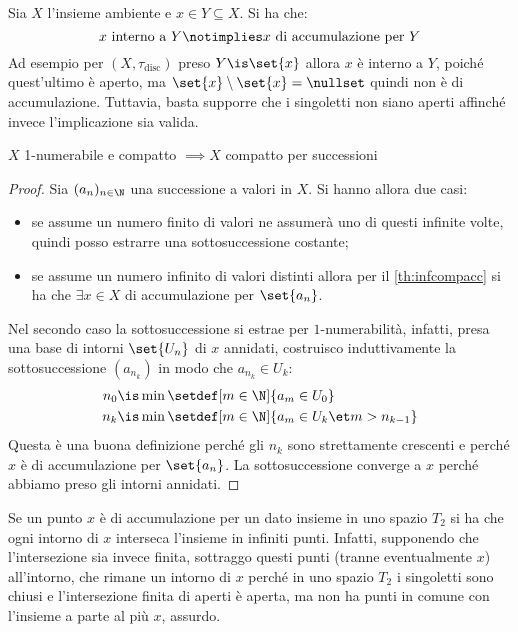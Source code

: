 

\begin{oss}
	Sia $X$ l'insieme ambiente e $x\in Y\subseteq X$.
	Si ha che:
	\[\text{$x$ interno a $Y$} \notimplies \text{$x$ di accumulazione per $Y$}\]
	Ad esempio per $(X, \tau_\text{disc})$ preso $Y\is\set{x}$ allora $x$ è interno a $Y$, poiché quest'ultimo è aperto, ma $\set{x}\setminus\set{x} = \nullset$ quindi non è di accumulazione.
	Tuttavia, basta supporre che i singoletti non siano aperti affinché invece l'implicazione sia valida.
\end{oss}

\begin{prop}
	$X$ 1-numerabile e compatto $\implies X$ compatto per successioni
\end{prop}

\begin{proof}
	Sia $(a_n)_{n\in\N}$ una successione a valori in $X$. Si hanno allora due casi:
	\begin{itemize}
		\item se assume un numero finito di valori ne assumerà uno di questi infinite volte, quindi posso estrarre una sottosuccessione costante;
		\item se assume un numero infinito di valori distinti allora per il \autoref{th:infcompacc} si ha che $\exists x\in X$ di accumulazione per $\set{a_n}$.
	\end{itemize}
	Nel secondo caso la sottosuccessione si estrae per $1$-numerabilità, infatti, presa una base di intorni $\set{U_n}$ di $x$ \wlg annidati, costruisco induttivamente la sottosuccessione $(a_{n_k})$ in modo che $a_{n_k}\in U_k$:
	\begin{align*}
		n_0 &\is \min\setdef[m\in\N]{a_m\in U_0} \\
		n_k &\is \min\setdef[m\in\N]{a_m\in U_k\et m>n_{k-1}}
	\end{align*}
	Questa è una buona definizione perché gli $n_k$ sono strettamente crescenti e perché $x$ è di accumulazione per $\set{a_n}$.
	La sottosuccessione converge a $x$ perché abbiamo preso gli intorni annidati.
\end{proof}

\begin{oss}
	Se un punto $x$ è di accumulazione per un dato insieme in uno spazio $T_2$ si ha che ogni intorno di $x$ interseca l'insieme in infiniti punti.
	Infatti, supponendo che l'intersezione sia invece finita, sottraggo questi punti (tranne eventualmente $x$) all'intorno, che rimane un intorno di $x$ perché in uno spazio $T_2$ i singoletti sono chiusi e l'intersezione finita di aperti è aperta, ma non ha punti in comune con l'insieme a parte al più $x$, assurdo.
\end{oss}

